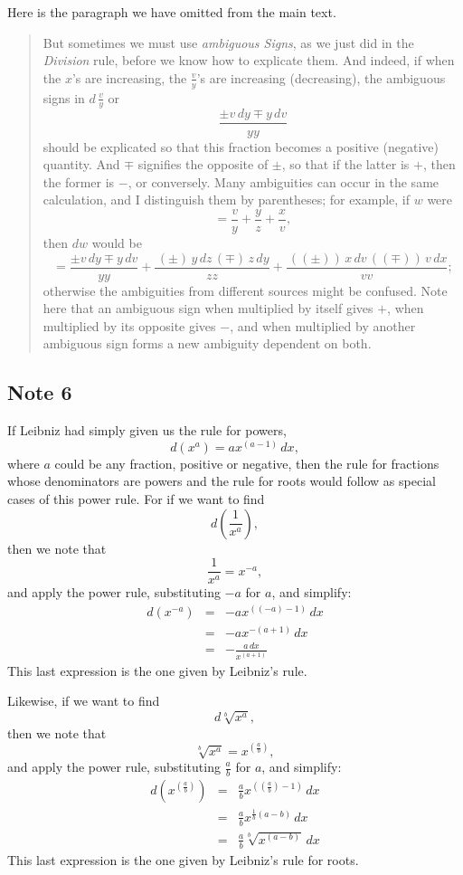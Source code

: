 \documentclass[twoside,openright]{article}
\newlength{\oldjot}
\begin{document}
Here is the paragraph we have omitted from the main text.
\begin{quote}
  But sometimes we must use {\em ambiguous Signs}, as we just did in
  the {\em Division} rule, before we know how to explicate them.  And
  indeed, if when the $x$'s are increasing, the $\frac{v}{y}$'s are
  increasing (decreasing), the ambiguous signs in $d\,\frac{v}{y}$ or
$$\frac{\pm v\,dy \mp y\,dv}{yy}$$ should be explicated so that this fraction
becomes a positive (negative) quantity.  And $\mp$ signifies the
opposite of $\pm$, so that if the latter is $+$, then the former is
$-$, or conversely.  Many ambiguities can occur in the same
calculation, and I distinguish them by parentheses; for example, if
$w$ were
$$=\frac{v}{y} + \frac{y}{z} +\frac{x}{v},$$ then $dw$ would be
$$= \frac{\pm v\,dy \mp y\,dv}{yy} + \frac{\,(\pm)\, y\,dz \,(\mp)\,
  z\,dy}{zz} + \frac{\,(\!(\pm)\!)\, x\,dv \,(\!(\mp)\!)\,
  v\,dx}{vv};$$ otherwise the ambiguities from different sources might
be confused.  Note here that an ambiguous sign when multiplied by
itself gives $+$, when multiplied by its opposite gives $-$, and when
multiplied by another ambiguous sign forms a new ambiguity dependent
on both.
\end{quote}





\subsection*{Note 6}
\label{cnm6}

If Leibniz had simply given us the rule for powers,
$$d(x^a) = ax^{(a-1)}\,dx,$$
where $a$ could be any fraction, positive or negative, then the rule
for fractions whose denominators are powers and the rule for roots
would follow as special cases of this power rule.  For if we want to
find
$$d\left(\frac{1}{x^a}\right),$$
then we note that 
$$\frac{1}{x^a} = x^{-a},$$
and apply the power rule, substituting $-a$ for $a$, and simplify:
\begin{eqnarray*}
d(x^{-a}) & = & -ax^{((-a)-1)}\,dx \\
& = & -ax^{-(a+1)}\,dx\\
& = & -\frac{a\,dx}{x^{(a+1)}}
\end{eqnarray*}
This last expression is the one given by Leibniz's rule.

Likewise, if we want to find
$$d\sqrt[b]{x^a},$$
then we note that
$$\sqrt[b]{x^a} = x^{(\frac{a}{b})},$$
and apply the power rule, substituting $\frac{a}{b}$ for $a$, and simplify:
\setlength{\jot}{1.5ex}
\begin{eqnarray*}
d(x^{(\frac{a}{b})}) & = & \frac{a}{b}x^{((\frac{a}{b})-1)}\,dx \\
& = & \frac{a}{b}x^{\frac{1}{b}(a-b)}\,dx\\
& = & \frac{a}{b}\sqrt[b]{x^{(a-b)}}\,dx
\end{eqnarray*}
\setlength{\jot}{\oldjot}
This last expression is the one given by Leibniz's rule for roots.
\end{document}
